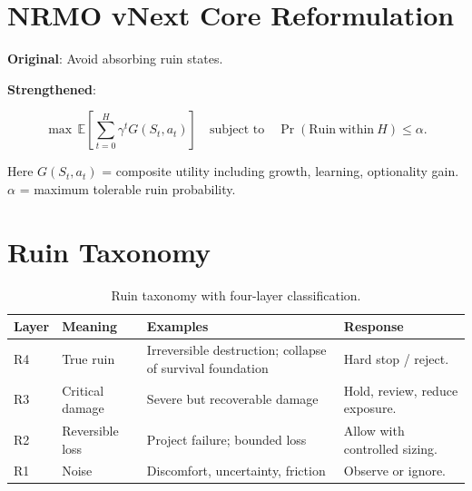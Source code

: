 \section{NRMO vNext Core Reformulation}
\label{sec:omega-core-reformulation}

\textbf{Original}: Avoid absorbing ruin states.

\textbf{Strengthened}:

\begin{equation}
\max\,\mathbb{E}\!\left[\sum_{t=0}^H \gamma^t G(S_t, a_t)\right]
\quad \text{subject to} \quad
\Pr(\mathrm{Ruin\ within\ } H) \le \alpha.
\label{eq:omega-strengthened-objective}
\end{equation}

Here $G(S_t, a_t)$ = composite utility including growth, learning,
optionality gain. $\alpha$ = maximum tolerable ruin probability.


\section{Ruin Taxonomy}
\label{sec:omega-ruin-taxonomy}

\begin{table}[ht]
\centering
\small
\begin{tabularx}{\linewidth}{lXXX}
\toprule
\textbf{Layer} & \textbf{Meaning} & \textbf{Examples} & \textbf{Response} \\
\midrule
R4 & True ruin & Irreversible destruction; collapse of survival
foundation & Hard stop / reject. \\
R3 & Critical damage & Severe but recoverable damage & Hold,
review, reduce exposure. \\
R2 & Reversible loss & Project failure; bounded loss & Allow with
controlled sizing. \\
R1 & Noise & Discomfort, uncertainty, friction & Observe or ignore. \\
\bottomrule
\end{tabularx}
\caption[Omega Ruin taxonomy]{Ruin taxonomy with four-layer
classification.}
\label{tab:omega-ruin-taxonomy}
\end{table}

